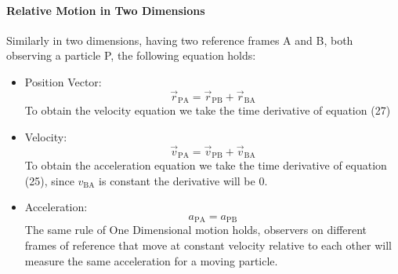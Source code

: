 \documentclass{scrartcl}
\begin{document}
    \paragraph{Relative Motion in Two Dimensions} Similarly in two dimensions, having two reference frames A and B, both observing a particle P, the following equation holds:
    \begin{itemize}
        \item Position Vector:
        \begin{equation}
            \vec{r}_{\mathrm{PA}} = \vec{r}_{\mathrm{PB}} + \vec{r}_{\mathrm{BA}}
        \end{equation}
        To obtain the velocity equation we take the time derivative of equation (27)
        \item Velocity:
        \begin{equation}
            \vec{v}_{\mathrm{PA}} = \vec{v}_{\mathrm{PB}} + \vec{v}_{\mathrm{BA}}
        \end{equation}
        To obtain the acceleration equation we take the time derivative of equation (25), since $v_{\mathrm{BA}}$ is constant the derivative will be $0$.
        \item Acceleration:
        \begin{equation}
            a_{\mathrm{PA}} = a_{\mathrm{PB}}
        \end{equation}
        The same rule of One Dimensional motion holds, observers on different frames of reference that move at constant velocity relative to each other will measure the same acceleration for a moving particle. 
    \end{itemize}
\end{document}
